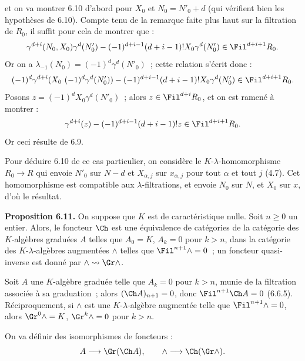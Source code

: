 
et on va
montrer 6.10 d'abord pour \(X_0\) et \(N_0=N'_0+d\) (qui vérifient bien les hypothèses de 6.10). Compte tenu de la remarque faite plus haut sur la filtration de \(R_0\), il suffit pour cela de montrer que :
\[
  \gamma^{d+i}(N_0,X_0)\gamma^d(N'_0)
  -
  (-1)^{d+i-1}(d+i-1)!X_0\gamma^d(N'_0)
  \in\Fil^{d+i+1}R_0 .
\]
Or on a \(\lambda_{-1}(N_0)=(-1)^d\gamma^d(N'_0)\)~; cette relation s'écrit donc :
\[
  (-1)^d\gamma^{d+i}(X_0\ (-1)^d\gamma^d(N'_0))
  -
  (-1)^{d+i-1}(d+i-1)!X_0\gamma^d(N'_0)
  \in\Fil^{d+i+1}R_0 .
\]
Posons \(z=(-1)^dX_0\gamma^d(N'_0)\)~; alors \(z\in\Fil^{d+i}R_0\), et on est ramené à montrer :
\[
  \gamma^{d+i}(z)-(-1)^{d+i-1}(d+i-1)!z\in\Fil^{d+i+1}R_0 .
\]
Or ceci résulte de 6.9.

Pour déduire 6.10 de ce cas particulier, on considère le \(K\)-\(\lambda\)-homomorphisme \(R_0\to R\) qui envoie \(N'_0\) sur \(N-d\) et \(X_{\alpha,j}\) sur \(x_{\alpha,j}\) pour tout \(\alpha\) et tout \(j\) (4.7). Cet homomorphisme est compatible aux \(\lambda\)-filtrations, et envoie \(N_0\) sur \(N\), et \(X_0\) sur \(x\), d'où le résultat.

\textbf{Proposition 6.11.} On suppose que \(K\) est de caractéristique nulle. Soit \(n\ge0\) un entier. Alors, le foncteur \(\Ch\) est une équivalence de catégories de la catégorie des \(K\)-algèbres graduées \(A\) telles que \(A_0=K\), \(A_k=0\) pour \(k>n\), dans la catégorie des \(K\)-\(\lambda\)-algèbres augmentées \(\mathord{\wedge}\) telles que \(\Fil^{n+1}\mathord{\wedge}=0\)~; un foncteur quasi-inverse est donné par \(\mathord{\wedge}\rightsquigarrow\Gr\mathord{\wedge}\).

Soit \(A\) une \(K\)-algèbre graduée telle que \(A_k=0\) pour \(k>n\), munie de la filtration associée à sa graduation~; alors \((\Ch A)_{n+1}=0\), donc \(\Fil^{n+1}\Ch A=0\) (6.6.5). Réciproquement, si \(\mathord{\wedge}\) est une \(K\)-\(\lambda\)-algèbre augmentée telle que \(\Fil^{n+1}\mathord{\wedge}=0\), alors \(\Gr^0\mathord{\wedge}=K\), \(\Gr^k\mathord{\wedge}=0\) pour \(k>n\).

On va définir des isomorphismes de foncteurs :
\[
  A\longrightarrow \Gr(\Ch A),
  \qquad
  \mathord{\wedge}\longrightarrow \Ch(\Gr\mathord{\wedge}).
\]
